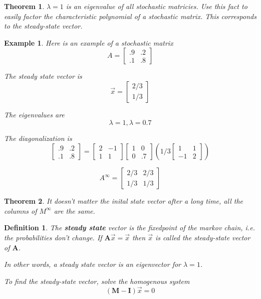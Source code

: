 \documentclass[11pt]{article}
\newtheorem{thm}{Theorem}
\newtheorem{defn}{Definition}
\newtheorem{ex}{Example}
\begin{document}
\begin{thm}
  $\lambda=1$ is an eigenvalue of all stochastic matricies. Use this fact to easily factor the characteristic polynomial of
  a stochastic matrix. This corresponds to the steady-state vector.
\end{thm}
\begin{ex}
  Here is an example of a stochastic matrix
  \[A = \begin{bmatrix} .9 & .2 \\ .1 & .8 \end{bmatrix}\]

  The steady state vector is
  \[\vec{x} = \begin{bmatrix} 2/3 \\ 1/3 \end{bmatrix}\]

  The eigenvalues are
  \[\lambda=1, \lambda = 0.7\]

  The diagonalization is
  \[\begin{bmatrix} .9 & .2 \\ .1 & .8 \end{bmatrix} = \begin{bmatrix} 2 & -1 \\ 1 & 1 \end{bmatrix} \begin{bmatrix} 1 & 0 \\ 0 & .7 \end{bmatrix}(1/3\begin{bmatrix} 1 & 1 \\ -1 & 2 \end{bmatrix})\]

  \[A^{\infty} = \begin{bmatrix} 2/3 & 2/3 \\ 1/3 & 1/3 \end{bmatrix}\]
\end{ex}

\begin{thm}
  It doesn't matter the inital state vector after a long time, all the columns of $M^{\infty}$ are the same.
\end{thm}
\begin{defn}
  The \textbf{steady state} vector is the fixedpoint of the markov chain, i.e. the probabilities don't change.
  If $\mathbf{A}\vec{x} = \vec{x}$
  then $\vec{x}$ is called the steady-state vector of $\mathbf{A}$.

  In other words, a steady state vector is an eigenvector for $\lambda =1$.

  To find the steady-state vector, solve the homogenous system
  \[(\mathbf{M}-\mathbf{I})\vec{x} = 0\]
\end{defn}
\end{document}
